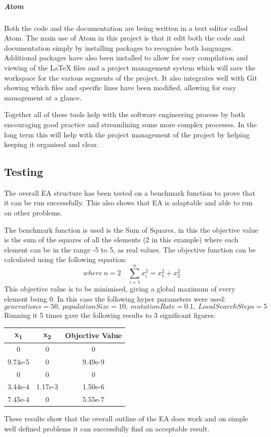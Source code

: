 \documentclass[a4paper]{article}
\begin{document}
\subparagraph{Atom}
Both the code and the documentation are being written in a text editor called Atom.
The main use of Atom in this project is that it edit both the code and documentation simply by installing packages to recognise both languages.
Additional packages have also been installed to allow for easy compilation and viewing of the LaTeX files and a project management system which will save the workspace for the various segments of the project.
It also integrates well with Git showing which files and specific lines have been modified, allowing for easy management at a glance.
\\ \par
Together all of these tools help with the software engineering process by both encouraging good practice and streamlining some more complex processes.
In the long term this will help with the project management of the project by helping keeping it organised and clear.
\subsection{Testing}
\par
The overall EA structure has been tested on a benchmark function to prove that it can be run successfully.
This also shows that EA is adaptable and able to run on other problems.
\par
The benchmark function is used is the Sum of Squares, in this the objective value is the sum of the squares of all the elements (2 in this example) where each element can be in the range -5 to 5, as real values.
The objective function can be calculated using the following equation:
\begin{equation}
    where\ n = 2\quad \sum_{i=1}^{n} x_i^2 = x_1^2 + x_2^2
\end{equation}
This objective value is to be minimised, giving a global maximum of every element being 0.
In this case the following hyper parameters were used:
\begin{equation}
    generations = 50,\ populationSize = 10,\ mutationRate = 0.1,\ LocalSearchSteps = 5
\end{equation}
Running it 5 times gave the following results to 3 significant figures:
\begin{center}
    \begin{tabular}{ c c | c }
        x\textsubscript{1} & x\textsubscript{2} & Objective Value \\
        \hline
        0 & 0 & 0 \\
        9.74e-5 & 0 & 9.49e-9 \\
        0 & 0 & 0 \\
        3.44e-4 & 1.17e-3 & 1.50e-6 \\
        7.45e-4 & 0 & 5.55e-7 \\
    \end{tabular}
\end{center}
\par
These results show that the overall outline of the EA does work and on simple well defined problems it can successfully find an acceptable result.
\end{document}

